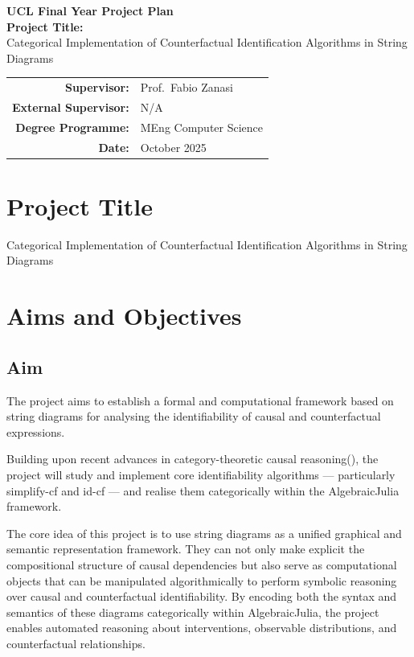 \documentclass[12pt,a4paper]{article}
\begin{document}
\begin{center}
    \vspace*{1cm}
    {\LARGE \textbf{UCL Final Year Project Plan}}\\[1.5em]
    {\Large \textbf{Project Title:}}\\[0.5em]
    {\large Categorical Implementation of Counterfactual Identification Algorithms in String Diagrams}\\[2em]
    \begin{tabular}{rl}
        \textbf{Supervisor:} & Prof.\ Fabio Zanasi \\
        \textbf{External Supervisor:} & N/A \\
        \textbf{Degree Programme:} & MEng Computer Science \\
        \textbf{Date:} & October 2025 \\
    \end{tabular}
\end{center}


\newpage


\section{Project Title}
Categorical Implementation of Counterfactual Identification Algorithms in String Diagrams

\section{Aims and Objectives}

\subsection*{Aim}
The project aims to establish a formal and computational framework based on string diagrams for analysing the identifiability of causal and counterfactual expressions.

Building upon recent advances in category-theoretic causal reasoning(\cite{lorenz2023causal}), the project will study and implement core identifiability algorithms — particularly simplify-cf and id-cf — and realise them categorically within the AlgebraicJulia framework.

The core idea of this project is to use string diagrams as a unified graphical and semantic representation framework.
They can not only make explicit the compositional structure of causal dependencies but also serve as computational objects that can be manipulated algorithmically to perform symbolic reasoning over causal and counterfactual identifiability.
By encoding both the syntax and semantics of these diagrams categorically within AlgebraicJulia, the project enables automated reasoning about interventions, observable distributions, and counterfactual relationships.
\end{document}
